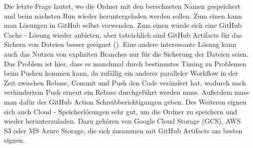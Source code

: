 Die letzte Frage lautet, wo die Ordner mit den berechneten Namen gespeichert und beim nächsten Run wieder heruntergeladen werden sollen.
Zum einen kann man Lösungen in GitHub selbst verwenden.
Zum einen würde sich eine GitHub Cache - Lösung wieder anbieten, aber tatsächlich sind GitHub Artifacts für das Sichern von Dateien besser geeignet (\cite{github_cache_doku}).
Eine andere interessante Lösung kann auch das Nutzen von expliziten Branches nur für die Sicherung der Dateien seien.
Das Problem ist hier, dass es manchmal durch bestimmtes Timing zu Problemen beim Pushen kommen kann, da zufällig ein anderer paralleler Workflow in der Zeit zwischen Rebase, Commit und Push den Code verändert hat, wodurch nach verhindertem Push erneut ein Rebase durchgeführt werden muss.
Außerdem muss man dafür der GitHub Action Schreibberichtigungen geben.
Des Weiteren eignen sich auch Cloud - Speicherlösungen sehr gut, um die Ordner zu speichern und wieder herunterzuladen.
Dazu gehören von Google Cloud Storage (GCS), AWS S3 oder MS Azure Storage, die sich zusammen mit GitHub Artifacts am besten eignen.